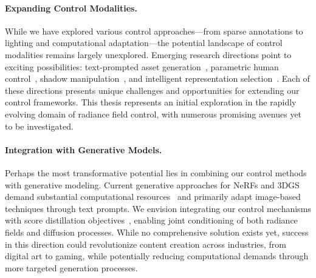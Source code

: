  \paragraph{Expanding Control Modalities.}
    While we have explored various control approaches—from sparse annotations to
    lighting and computational adaptation—the potential landscape of control
    modalities remains largely unexplored.
    Emerging research directions point to exciting possibilities: text-prompted
    asset generation~\cite{tang2024dreamgaussian}, parametric human
    control~\cite{kocabas2024hugs}, shadow manipulation~\cite{solnerf}, and
    intelligent representation selection~\cite{he2024nerfs}.
    Each of these directions presents unique challenges and opportunities for
    extending our control frameworks.
    This thesis represents an initial exploration in the rapidly evolving domain
    of radiance field control, with numerous promising avenues yet to be
    investigated.

  \paragraph{Integration with Generative Models.}
    Perhaps the most transformative potential lies in combining our control
    methods with generative modeling.
    Current generative approaches for NeRFs and 3DGS demand substantial
    computational resources~\cite{tang2024dreamgaussian} and primarily adapt
    image-based techniques through text prompts.
    We envision integrating our control mechanisms with score distillation
    objectives~\cite{poole2023dreamfusion}, enabling joint conditioning of both
    radiance fields and diffusion processes.
    While no comprehensive solution exists yet, success in this direction could
    revolutionize content creation across industries, from digital art to gaming,
    while potentially reducing computational demands through more targeted
    generation processes.
